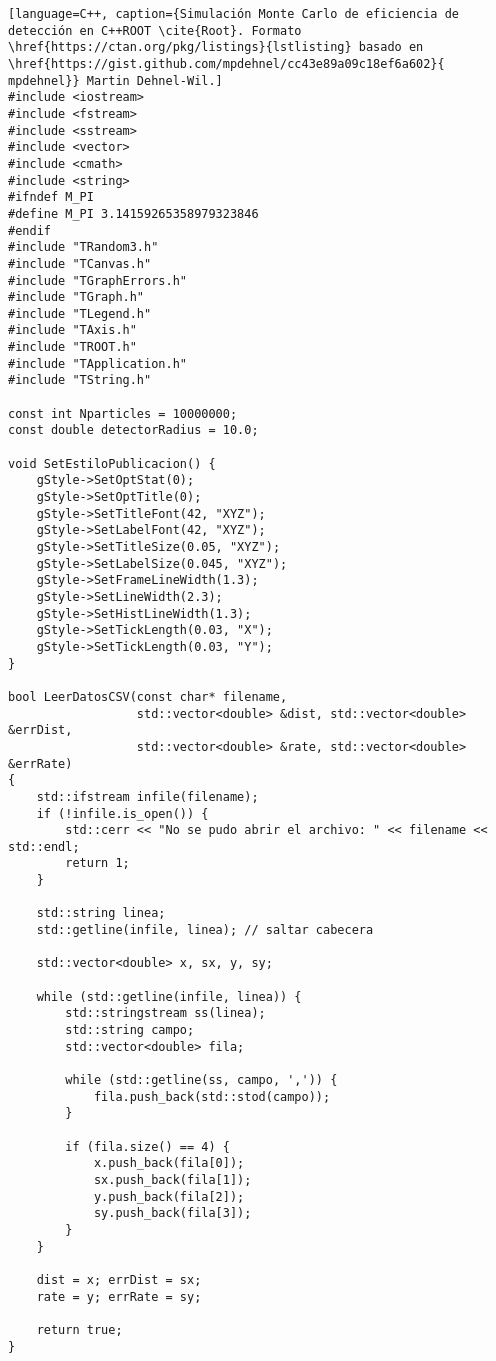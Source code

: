 \begin{lstlisting}[language=C++, caption={Simulación Monte Carlo de eficiencia de detección en C++ROOT \cite{Root}. Formato \href{https://ctan.org/pkg/listings}{lstlisting} basado en \href{https://gist.github.com/mpdehnel/cc43e89a09c18ef6a602}{
mpdehnel}} Martin Dehnel-Wil.]
#include <iostream>
#include <fstream>
#include <sstream>
#include <vector>
#include <cmath>
#include <string>
#ifndef M_PI
#define M_PI 3.14159265358979323846
#endif
#include "TRandom3.h"
#include "TCanvas.h"
#include "TGraphErrors.h"
#include "TGraph.h"
#include "TLegend.h"
#include "TAxis.h"
#include "TROOT.h"
#include "TApplication.h"
#include "TString.h"

const int Nparticles = 10000000;
const double detectorRadius = 10.0;

void SetEstiloPublicacion() {
    gStyle->SetOptStat(0);
    gStyle->SetOptTitle(0);
    gStyle->SetTitleFont(42, "XYZ");
    gStyle->SetLabelFont(42, "XYZ");
    gStyle->SetTitleSize(0.05, "XYZ");
    gStyle->SetLabelSize(0.045, "XYZ");
    gStyle->SetFrameLineWidth(1.3);
    gStyle->SetLineWidth(2.3);
    gStyle->SetHistLineWidth(1.3);
    gStyle->SetTickLength(0.03, "X");
    gStyle->SetTickLength(0.03, "Y");
}

bool LeerDatosCSV(const char* filename,
                  std::vector<double> &dist, std::vector<double> &errDist,
                  std::vector<double> &rate, std::vector<double> &errRate)
{
    std::ifstream infile(filename);
    if (!infile.is_open()) {
        std::cerr << "No se pudo abrir el archivo: " << filename << std::endl;
        return 1;
    }

    std::string linea;
    std::getline(infile, linea); // saltar cabecera

    std::vector<double> x, sx, y, sy;

    while (std::getline(infile, linea)) {
        std::stringstream ss(linea);
        std::string campo;
        std::vector<double> fila;

        while (std::getline(ss, campo, ',')) {
            fila.push_back(std::stod(campo));
        }

        if (fila.size() == 4) {
            x.push_back(fila[0]);
            sx.push_back(fila[1]);
            y.push_back(fila[2]);
            sy.push_back(fila[3]);
        }
    }

    dist = x; errDist = sx;
    rate = y; errRate = sy;

    return true;
}


\end{lstlisting}

